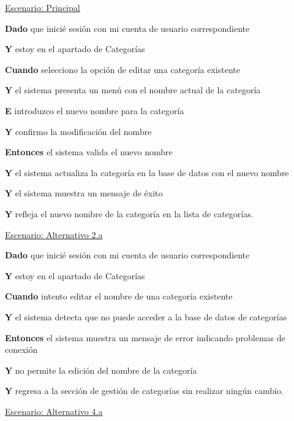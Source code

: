 \underline{Escenario: Principal}\par
\vspace{0.15cm}

\textbf{Dado} que inicié sesión con mi cuenta de usuario correspondiente\par
\textbf{Y} estoy en el apartado de Categorías\par
\textbf{Cuando} selecciono la opción de editar una categoría existente\par
\textbf{Y} el sistema presenta un menú con el nombre actual de la categoría\par
\textbf{E} introduzco el nuevo nombre para la categoría\par
\textbf{Y} confirmo la modificación del nombre\par
\textbf{Entonces} el sistema valida el nuevo nombre\par
\textbf{Y} el sistema actualiza la categoría en la base de datos con el nuevo nombre\par
\textbf{Y} el sistema muestra un mensaje de éxito\par
\textbf{Y} refleja el nuevo nombre de la categoría en la lista de categorías.\par


\vspace{0.20cm}

\underline{Escenario: Alternativo 2.a}\par
\vspace{0.15cm}

\textbf{Dado} que inicié sesión con mi cuenta de usuario correspondiente\par
\textbf{Y} estoy en el apartado de Categorías\par
\textbf{Cuando} intento editar el nombre de una categoría existente\par
\textbf{Y} el sistema detecta que no puede acceder a la base de datos de categorías\par
\textbf{Entonces} el sistema muestra un mensaje de error indicando problemas de conexión\par
\textbf{Y} no permite la edición del nombre de la categoría\par
\textbf{Y} regresa a la sección de gestión de categorías sin realizar ningún cambio.\par


\vspace{0.20cm}

\underline{Escenario: Alternativo 4.a}\par
\vspace{0.15cm}


